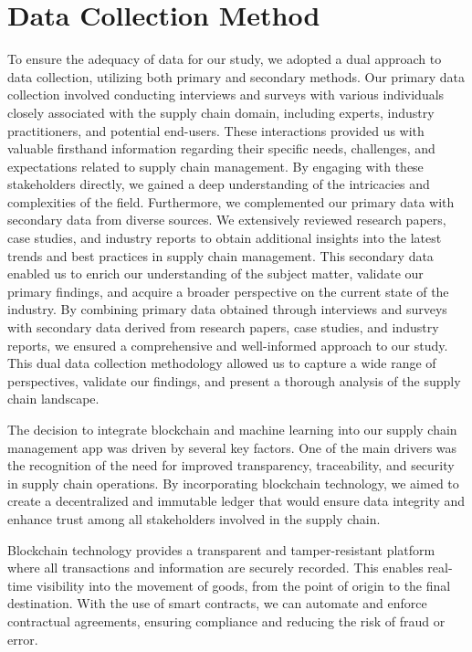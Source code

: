 \section{Data Collection Method}
\noindent To ensure the adequacy of data for our study, we adopted a dual approach to data collection, utilizing both primary and secondary methods. Our primary data collection involved conducting interviews and surveys with various individuals closely associated with the supply chain domain, including experts, industry practitioners, and potential end-users. These interactions provided us with valuable firsthand information regarding their specific needs, challenges, and expectations related to supply chain management. By engaging with these stakeholders directly, we gained a deep understanding of the intricacies and complexities of the field.
Furthermore, we complemented our primary data with secondary data from diverse sources. We extensively reviewed research papers, case studies, and industry reports to obtain additional insights into the latest trends and best practices in supply chain management. This secondary data enabled us to enrich our understanding of the subject matter, validate our primary findings, and acquire a broader perspective on the current state of the industry.
By combining primary data obtained through interviews and surveys with secondary data derived from research papers, case studies, and industry reports, we ensured a comprehensive and well-informed approach to our study. This dual data collection methodology allowed us to capture a wide range of perspectives, validate our findings, and present a thorough analysis of the supply chain landscape.


\noindent The decision to integrate blockchain and machine learning into our supply chain management app was driven by several key factors. One of the main drivers was the recognition of the need for improved transparency, traceability, and security in supply chain operations. By incorporating blockchain technology, we aimed to create a decentralized and immutable ledger that would ensure data integrity and enhance trust among all stakeholders involved in the supply chain.
\par Blockchain technology provides a transparent and tamper-resistant platform where all transactions and information are securely recorded. This enables real-time visibility into the movement of goods, from the point of origin to the final destination. With the use of smart contracts, we can automate and enforce contractual agreements, ensuring compliance and reducing the risk of fraud or error.    
